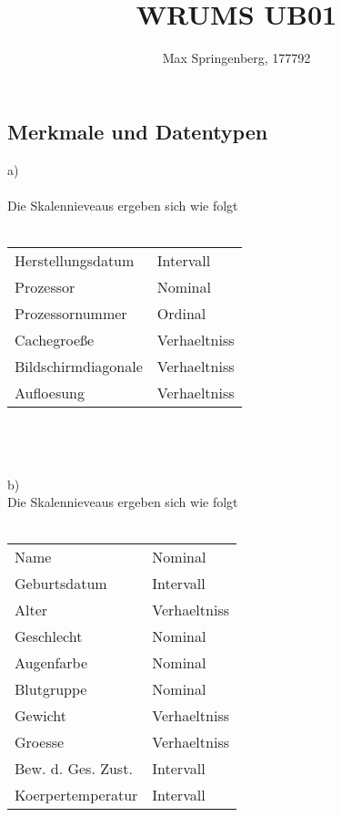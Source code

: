 \documentclass{article}
\author{Max Springenberg, 177792}
\title{
    WRUMS UB01
}
\date{}
\newcommand{\gap}{\\ \ \\}
\begin{document}
\maketitle
\newpage

\subsection{Merkmale und Datentypen}
a)\\
\\
Die Skalennieveaus ergeben sich wie folgt\\
\\
\begin{tabular}{ll}
    Herstellungsdatum&      Intervall\\
    Prozessor&              Nominal\\
    Prozessornummer&        Ordinal\\
    Cachegroeße&            Verhaeltniss\\
    Bildschirmdiagonale&    Verhaeltniss\\
    Aufloesung&             Verhaeltniss\\
\end{tabular}\\
\gap
b)\\
Die Skalennieveaus ergeben sich wie folgt\\
\\
\begin{tabular}{ll}
    Name&           Nominal\\
    Geburtsdatum&   Intervall\\
    Alter&          Verhaeltniss\\
    Geschlecht&     Nominal\\
    Augenfarbe&     Nominal\\
    Blutgruppe&     Nominal\\
    Gewicht&        Verhaeltniss\\
    Groesse&        Verhaeltniss\\
    Bew. d. Ges. Zust.& Intervall\\
    Koerpertemperatur& Intervall\\
\end{tabular}\\
\end{document}
